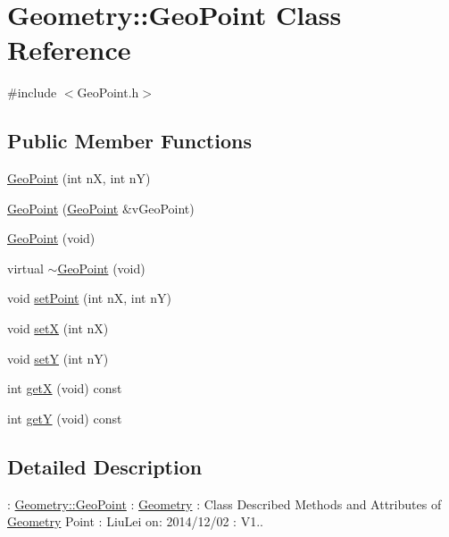 \hypertarget{class_geometry_1_1_geo_point}{\section{Geometry\+:\+:Geo\+Point Class Reference}
\label{class_geometry_1_1_geo_point}
}


{\ttfamily \#include $<$Geo\+Point.\+h$>$}

\subsection*{Public Member Functions}
\begin{DoxyCompactItemize}
\item 
\hyperlink{class_geometry_1_1_geo_point_ac156989ab6aace9a1ae0fb744b53a3d2}{Geo\+Point} (int n\+X, int n\+Y)
\item 
\hyperlink{class_geometry_1_1_geo_point_ae1d10f4d306b9373c58a7b201917cb38}{Geo\+Point} (\hyperlink{class_geometry_1_1_geo_point}{Geo\+Point} \&v\+Geo\+Point)
\item 
\hyperlink{class_geometry_1_1_geo_point_ac2ee617302013ef00cf74971ee7ea078}{Geo\+Point} (void)
\item 
virtual \hyperlink{class_geometry_1_1_geo_point_a72a292d8d16267996f8a4d260cb5c493}{$\sim$\+Geo\+Point} (void)
\item 
void \hyperlink{class_geometry_1_1_geo_point_a58dd152acc86d6f7207cec462cdb8c7a}{set\+Point} (int n\+X, int n\+Y)
\item 
void \hyperlink{class_geometry_1_1_geo_point_a35e2cab4f70bbce8d0575b08f1e70771}{set\+X} (int n\+X)
\item 
void \hyperlink{class_geometry_1_1_geo_point_a6f19ed67ab52f628a4c6639e8f30a7d7}{set\+Y} (int n\+Y)
\item 
int \hyperlink{class_geometry_1_1_geo_point_a20dbdd7a551e1d2ea42607b453855ca3}{get\+X} (void) const 
\item 
int \hyperlink{class_geometry_1_1_geo_point_aacdb8ed6b6efd50a57277779bac8c0ae}{get\+Y} (void) const 
\end{DoxyCompactItemize}


\subsection{Detailed Description}
\+: \hyperlink{class_geometry_1_1_geo_point}{Geometry\+::\+Geo\+Point} \+: \hyperlink{namespace_geometry}{Geometry} \+: Class Described Methods and Attributes of \hyperlink{namespace_geometry}{Geometry} Point \+: Liu\+Lei  on\+: 2014/12/02 \+: V1.. 


